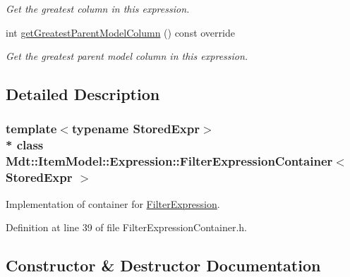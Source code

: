 \begin{DoxyCompactItemize}
\begin{DoxyCompactList}\small\item\em Get the greatest column in this expression. \end{DoxyCompactList}\item 
int \hyperlink{class_mdt_1_1_item_model_1_1_expression_1_1_filter_expression_container_adb2cfc620dcd571919e1e9c516017013}{get\+Greatest\+Parent\+Model\+Column} () const override\hypertarget{class_mdt_1_1_item_model_1_1_expression_1_1_filter_expression_container_adb2cfc620dcd571919e1e9c516017013}{}\label{class_mdt_1_1_item_model_1_1_expression_1_1_filter_expression_container_adb2cfc620dcd571919e1e9c516017013}

\begin{DoxyCompactList}\small\item\em Get the greatest parent model column in this expression. \end{DoxyCompactList}\end{DoxyCompactItemize}


\subsection{Detailed Description}
\subsubsection*{template$<$typename Stored\+Expr$>$\\*
class Mdt\+::\+Item\+Model\+::\+Expression\+::\+Filter\+Expression\+Container$<$ Stored\+Expr $>$}

Implementation of container for \hyperlink{class_mdt_1_1_item_model_1_1_filter_expression}{Filter\+Expression}. 

Definition at line 39 of file Filter\+Expression\+Container.\+h.



\subsection{Constructor \& Destructor Documentation}
